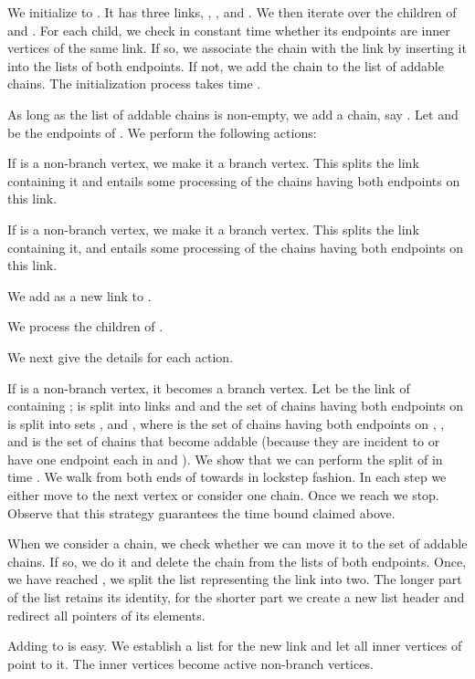 \documentclass[paper=a4]{scrartcl}
\begin{document}
We initialize  to . It has three links, , , and . We then iterate over the children of  and . For each child, we check in constant time whether its endpoints are inner vertices of the same link. If so, we associate the chain with the link by inserting it into the lists of both endpoints. If not, we add the chain to the list of addable chains. The initialization process takes time .

As long as the list of addable chains is non-empty, we add a chain, say . Let  and  be the endpoints of . We perform the following actions:
\begin{compactitem}
\item If  is a non-branch vertex, we make it a branch vertex. This splits the link containing it and entails some processing of the chains having both endpoints on this link.
\item If  is a non-branch vertex, we make it a branch vertex. This splits the link containing it, and entails some processing of the chains having both endpoints on this link.
\item We add  as a new link to .
\item We process the children of .
\end{compactitem}
We next give the details for each action.

If  is a non-branch vertex, it becomes a branch vertex. Let  be the link of  containing ;  is split into links  and  and the set  of chains having both endpoints on  is split into sets ,  and , where  is the set of chains having both endpoints on , , and  is the set of chains that become addable (because they are incident to  or have one endpoint each in  and ). We show that we can perform the split of  in time . We walk from both ends of  towards  in lockstep fashion. In each step we either move to the next vertex or consider one chain. Once we reach  we stop. Observe that this strategy guarantees the time bound claimed above.

When we consider a chain, we check whether we can move it to the set of addable chains. If so, we do it and delete the chain from the lists of both endpoints. Once, we have reached , we split the list representing the link into two. The longer part of the list retains its identity, for the shorter part we create a new list header and redirect all pointers of its elements.

Adding  to  is easy. We establish a list for the new link and let all inner vertices of  point to it. The inner vertices become active non-branch vertices.
\end{document}
